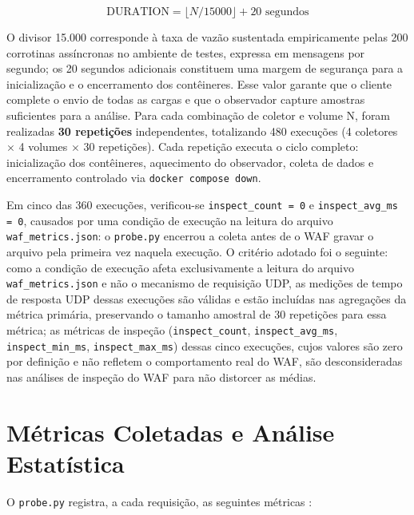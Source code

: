\begin{equation}
\text{DURATION} = \lfloor N / 15000 \rfloor + 20 \text{ segundos}
\label{eq:duration}
\end{equation}

O divisor 15.000 corresponde à taxa de vazão sustentada empiricamente pelas 200 corrotinas assíncronas no ambiente de testes, expressa em mensagens por segundo; os 20 segundos adicionais constituem uma margem de segurança para a inicialização e o encerramento dos contêineres. Esse valor garante que o cliente complete o envio de todas as cargas e que o observador capture amostras suficientes para a análise. Para cada combinação de coletor e volume N, foram realizadas \textbf{30 repetições} independentes, totalizando 480 execuções (4 coletores $\times$ 4 volumes $\times$ 30 repetições). Cada repetição executa o ciclo completo: inicialização dos contêineres, aquecimento do observador, coleta de dados e encerramento controlado via \texttt{docker compose down}.

Em cinco das 360 execuções, verificou-se \texttt{inspect\_count = 0} e \texttt{inspect\_avg\_ms = 0}, causados por uma condição de execução na leitura do arquivo \texttt{waf\_metrics.json}: o \texttt{probe.py} encerrou a coleta antes de o WAF gravar o arquivo pela primeira vez naquela execução. O critério adotado foi o seguinte: como a condição de execução afeta exclusivamente a leitura do arquivo \texttt{waf\_metrics.json} e não o mecanismo de requisição UDP, as medições de tempo de resposta UDP dessas execuções são válidas e estão incluídas nas agregações da métrica primária, preservando o tamanho amostral de 30 repetições para essa métrica; as métricas de inspeção (\texttt{inspect\_count}, \texttt{inspect\_avg\_ms}, \texttt{inspect\_min\_ms}, \texttt{inspect\_max\_ms}) dessas cinco execuções, cujos valores são zero por definição e não refletem o comportamento real do WAF, são desconsideradas nas análises de inspeção do WAF para não distorcer as médias.

\section{Métricas Coletadas e Análise Estatística}

O \texttt{probe.py} registra, a cada requisição, as seguintes métricas \cite{rfc8172}:


